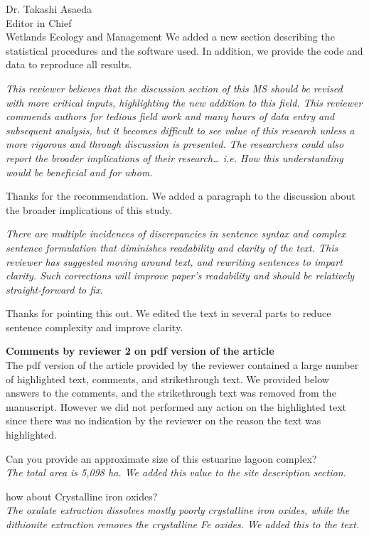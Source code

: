 \documentclass[11pt]{bgcletter}
\begin{document}
\begin{letter}{Dr. Takashi Asaeda\\
 Editor in Chief \\ Wetlands Ecology and Management}
{\color{blue} We added a new section describing the statistical procedures and the software used. In addition, we provide the code and data to reproduce all results.}

{\it This reviewer believes that the discussion section of this MS should be revised with more critical inputs, highlighting the new addition to this field. This reviewer commends authors for tedious field work and many hours of data entry and subsequent analysis, but it becomes difficult to see value of this research unless a more rigorous and through discussion is presented. The researchers could also report the broader implications of their research… i.e. How this understanding would be beneficial and for whom.}

{\color{blue} Thanks for the recommendation. We added a paragraph to the discussion about the broader implications of this study.}

{\it There are multiple incidences of discrepancies in sentence syntax and complex sentence formulation that diminishes readability and clarity of the text. This reviewer has suggested moving around text, and rewriting sentences to impart clarity. Such corrections will improve paper's readability and should be relatively straight-forward to fix. }

{\color{blue} Thanks for pointing this out. We edited the text in several parts to reduce sentence complexity and improve clarity.}

\vspace{2em}
{\bf Comments by reviewer 2 on pdf version of the article} \\
The pdf version of the article provided by the reviewer contained a large number of highlighted text, comments, and strikethrough text. We provided below answers to the comments, and the strikethrough text was removed from the manuscript. However we did not performed any action on the highlighted text since there was no indication by the reviewer on the reason the text was highlighted. 

{\color{blue} Can you provide an approximate size of this estuarine lagoon complex?} \\
{\it The total area is 5,098 ha. We added this value to the site description section. }

{\color{blue} how about Crystalline iron oxides? } \\
{\it The oxalate extraction dissolves mostly poorly crystalline iron oxides, while the dithionite extraction removes the crystalline Fe oxides. We added this to the text. }


\end{letter}
\end{document}
